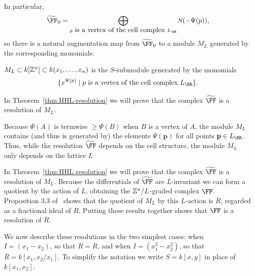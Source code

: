 \documentclass{amsart}
\begin{document}
In particular,
$$
\tF_{0} = \bigoplus_{p \hbox{ is a vertex of the cell complex }L_{\RR}}S(-\Psi(p)),
$$
so there is a natural augmentation map from $\tF_{0}$ to a module $M_{L}$ generated by the corresponding monomials:

\begin{defn}\label{def:M_{L}}
 $M_{L}\subset k[\mathbb Z^{n}]\subset k(x_{1}, \dots, x_{n})$ is the $S$-submodule generated by the monomials
 $$
 \{x^{\Psi(p)} \mid p \hbox{ is a vertex of the cell complex }L_{\RR}\}.
 $$
\end{defn}


In Theorem~\ref{thm:HHL-resolution} we will prove that the complex $\tF$ is a resolution of $M_L$.

\begin{remark}
 Because $\Psi(A)$ is termwise $\geq \Psi(B)$ when $B$ is a vertex of $A$, the module $M_{L}$ contains (and thus is generated by) the elements $\Psi(\mathbf{p})$ for all points $\mathbf{p}\in L_{\RR}$. Thus, while the resolution $\tF$ depends on the cell structure, the module $M_L$ only depends on the lattice $L$
\end{remark}

In Theorem~\ref{thm:HHL resolution} we will prove that the complex $\tF$ is a resolution of $M_L$.
Because the differentials of $\tF$ are $L$-invariant we can form a quotient by the action of $L$, obtaining the $\mathbb Z^{n}/L$-graded complex $\FF$. Proposition 3.3 of~\cite{BCS+25} shows  that the quotient of $M_L$ by this $L$-action is $\overline{R}$, regarded as a fractional ideal of $R$. Putting these results together shows that  $\FF$ is a resolution of $\overline R$.



We now describe these resolutions in the two simplest cases: when $I = (x_1-x_2)$, so that $\overline R = R$, and when $I = (x_1^3-x_2^2)$, so that $\overline R = k[x_1,x_2/x_1]$. 
To simplify the notation we write $S =k[x,y]$ in place of $k[x_1,x_2]$.  
\end{document}
